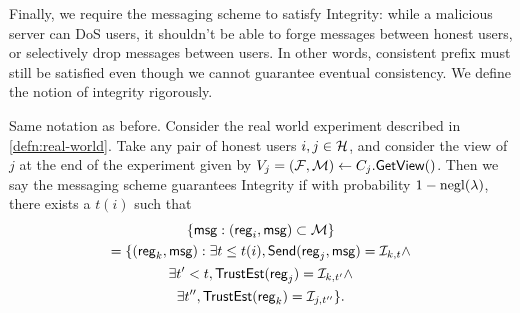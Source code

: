Finally, we require the messaging scheme to satisfy Integrity: while a malicious server can DoS users, it shouldn't be able to forge messages between honest users, or selectively drop messages between users. In other words, consistent prefix must still be satisfied even though we cannot guarantee eventual consistency. We define the notion of integrity rigorously.
\begin{definition}[Integrity]
\label{defn:integrity}
Same notation as before. Consider the real world experiment described in \cref{defn:real-world}. Take any pair of honest users $i, j \in \mathcal{H}$, and consider the view of $j$ at the end of the experiment given by $V_j = (\mathcal{F}, \mathcal{M}) \leftarrow C_j.\mathsf{GetView}()$.  Then we say the messaging scheme guarantees Integrity if with probability $1 - \operatorname{negl}(\lambda)$, there exists a $t(i)$ such that
\begin{multline*}
     \{\mathsf{msg} : (\mathsf{reg}_i, \mathsf{msg}) \subset \mathcal{M}\} \\
      = \{(\mathsf{reg}_k, \mathsf{msg}): \exists t \leq t(i), \mathsf{Send}(\mathsf{reg}_j, \mathsf{msg}) = \mathcal{I}_{k, t} \land \\
             \exists t' < t, \mathsf{TrustEst}(\mathsf{reg}_j) = \mathcal{I}_{k, t'} \land \\
             \exists t'', \mathsf{TrustEst}(\mathsf{reg}_k) = \mathcal{I}_{j, t''}\}. \\   
\end{multline*}
\end{definition}